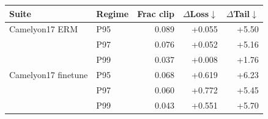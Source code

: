 \begin{tabular}{llrrr}
\toprule
Suite & Regime & Frac clip & $\Delta$Loss$\downarrow$ & $\Delta$Tail$\downarrow$ \\
\midrule
Camelyon17 ERM & P95 & 0.089 & +0.055 & +5.50 \\
 & P97 & 0.076 & +0.052 & +5.16 \\
 & P99 & 0.037 & +0.008 & +1.76 \\
Camelyon17 finetune & P95 & 0.068 & +0.619 & +6.23 \\
 & P97 & 0.060 & +0.772 & +5.45 \\
 & P99 & 0.043 & +0.551 & +5.70 \\
\bottomrule
\end{tabular}
